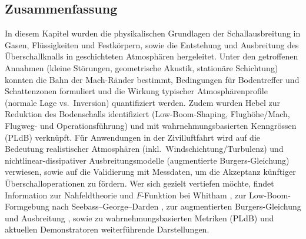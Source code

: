 \subsection{Zusammenfassung}
In diesem Kapitel wurden die physikalischen Grundlagen der
Schallausbreitung in Gasen, Flüssigkeiten und Festkörpern, sowie die
Entstehung und Ausbreitung des Überschallknalls in geschichteten
Atmosphären hergeleitet.
Unter den getroffenen Annahmen (kleine Störungen, geometrische Akustik,
stationäre Schichtung) konnten die Bahn der Mach-Ränder bestimmt,
Bedingungen für Bodentreffer und Schattenzonen formuliert und die Wirkung
typischer Atmosphärenprofile (normale Lage vs.~Inversion) quantifiziert werden.
Zudem wurden Hebel zur Reduktion des Bodenschalls identifiziert
(Low-Boom-Shaping, Flughöhe/Mach, Flugweg- und Operationsführung) und mit
wahrnehmungsbasierten Kenngrössen (PLdB) verknüpft.
Für Anwendungen in der Zivilluftfahrt wird auf die Bedeutung
realistischer Atmosphären (inkl.~Windschichtung/Turbulenz) und
nichtlinear-dissipativer Ausbreitungsmodelle
(augmentierte Burgers-Gleichung) verwiesen,
sowie auf die Validierung mit Messdaten, um die Akzeptanz künftiger
Überschalloperationen zu fördern.
Wer sich gezielt vertiefen möchte, findet Information zur Nahfeldtheorie
und $F$-Funktion bei Whitham \cite{schall:whitham},
zur Low-Boom-Formgebung nach Seebass–George–Darden \cite{schall:seebassgeorge,schall:darden75},
zur augmentierten Burgers-Gleichung und Ausbreitung \cite{schall:burgersJASA},
sowie zu wahrnehmungsbasierten Metriken (PLdB) und aktuellen
Demonstratoren \cite{schall:x59pldb} weiterführende Darstellungen.

